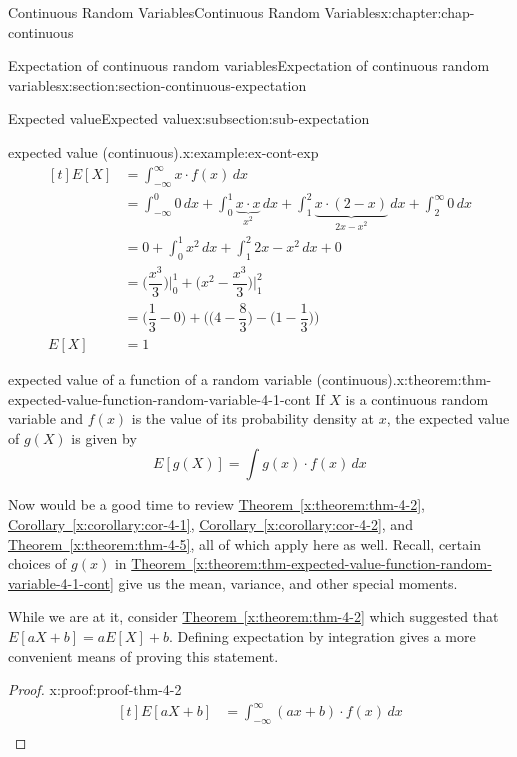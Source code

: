 \documentclass[oneside,10pt,]{book}
\newcommand{\xreffont}{\relax}
\newcommand{\amp}{&}
\begin{document}
\begin{chapterptx}{Continuous Random Variables}{}{Continuous Random Variables}{}{}{x:chapter:chap-continuous}
\begin{sectionptx}{Expectation of continuous random variables}{}{Expectation of continuous random variables}{}{}{x:section:section-continuous-expectation}
\begin{subsectionptx}{Expected value}{}{Expected value}{}{}{x:subsection:sub-expectation}
\begin{example}{expected value (continuous).}{x:example:ex-cont-exp}
\begin{equation*}
\begin{aligned}[t]
E[X] \amp = \int_{-\infty}^\infty x\cdot f(x)\,dx\\
\amp = \int_{-\infty}^0 0\,dx + \int_{0}^1 \underbrace{x\cdot
x}_{x^2}\,dx + \int_{1}^2 \underbrace{x\cdot(2-x)}_{2x-x^2}\,dx +
\int_2^{\infty} 0\,dx\\
\amp = 0 + \int_{0}^1 x^2\,dx + \int_{1}^2 2x-x^2\,dx + 0\\
\amp = \Big(\dfrac{x^3}{3}\Big)\Big|_0^1 +
\Big(x^2-\dfrac{x^3}{3}\Big)\Big|_1^2\\
\amp = \Big(\dfrac{1}{3} - 0\Big) + \Big(\Big(4-\dfrac{8}{3}\Big) -
\Big(1-\dfrac{1}{3}\Big)\Big)\\ 
E[X] \amp = 1
\end{aligned}
\end{equation*}
\end{example}
\begin{theorem}{expected value of a function of a random variable (continuous).}{}{x:theorem:thm-expected-value-function-random-variable-4-1-cont}%
If \(X\) is a continuous random variable and \(f(x)\) is the value of its probability density at \(x\), the expected value of \(g(X)\) is given by%
\begin{equation*}
E[g(X)] = \int g(x)\cdot f(x)\,dx
\end{equation*}
%
\end{theorem}
Now would be a good time to review \hyperref[x:theorem:thm-4-2]{Theorem~{\xreffont\ref{x:theorem:thm-4-2}}}, \hyperref[x:corollary:cor-4-1]{Corollary~{\xreffont\ref{x:corollary:cor-4-1}}}, \hyperref[x:corollary:cor-4-2]{Corollary~{\xreffont\ref{x:corollary:cor-4-2}}}, and \hyperref[x:theorem:thm-4-5]{Theorem~{\xreffont\ref{x:theorem:thm-4-5}}}, all of which apply here as well. Recall, certain choices of \(g(x)\) in \hyperref[x:theorem:thm-expected-value-function-random-variable-4-1-cont]{Theorem~{\xreffont\ref{x:theorem:thm-expected-value-function-random-variable-4-1-cont}}} give us the mean, variance, and other special moments.%
\par
While we are at it, consider \hyperref[x:theorem:thm-4-2]{Theorem~{\xreffont\ref{x:theorem:thm-4-2}}} which suggested that \(E[aX+b] = aE[X]+b\). Defining expectation by integration gives a more convenient means of proving this statement. \begin{proof}{}{x:proof:proof-thm-4-2}
%
\begin{equation*}
\begin{aligned}[t]
E[aX+b] \amp = \int_{-\infty}^\infty (ax+b)\cdot f(x)\,dx\\

\end{aligned}
\end{equation*}
\end{proof}
\end{subsectionptx}
\end{sectionptx}
\end{chapterptx}
\end{document}

